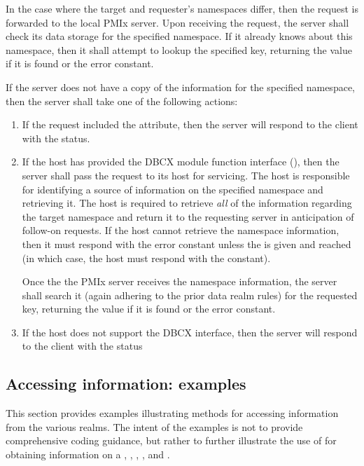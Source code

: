 In the case where the target and requester's namespaces differ, then the
request is forwarded to the local \ac{PMIx} server. Upon receiving the
request, the server shall check its data storage for the specified namespace.
If it already knows about this namespace, then it shall attempt to lookup the
specified key, returning the value if it is found or the
 error constant.

If the server does not have a copy of the information for the specified
namespace, then the server shall take one of the following actions:
\begin{enumerate}
    \item If the request included the  attribute, then
    the server will respond to the client with the
     status.
    \item If the host has provided the \ac{DBCX} module function interface
    (), then the server shall pass the
    request to its host for servicing. The host is responsible for identifying
    a source of information on the specified namespace and retrieving it. The
    host is required to retrieve \emph{all} of the information regarding the target namespace
    and return it to the requesting server in anticipation of follow-on
    requests. If the host cannot retrieve the
    namespace information, then it must respond with the  error constant unless the  is given and reached (in which case, the host must respond with the  constant).

    Once the the \ac{PMIx} server receives the namespace information, the server shall search it (again adhering to the prior data realm rules) for the requested key, returning the value if it is found or the  error constant.
    \item If the host does not support the \ac{DBCX} interface, then the
    server will respond to the client with the 
    status
\end{enumerate}


\subsection{Accessing information: examples}
\label{chap:api_rsvd_keys:getex}

This section provides examples illustrating methods for accessing information from the various realms. The intent of the examples is not to provide comprehensive coding guidance, but rather to further illustrate the use of  for obtaining information on a , , , , and .


